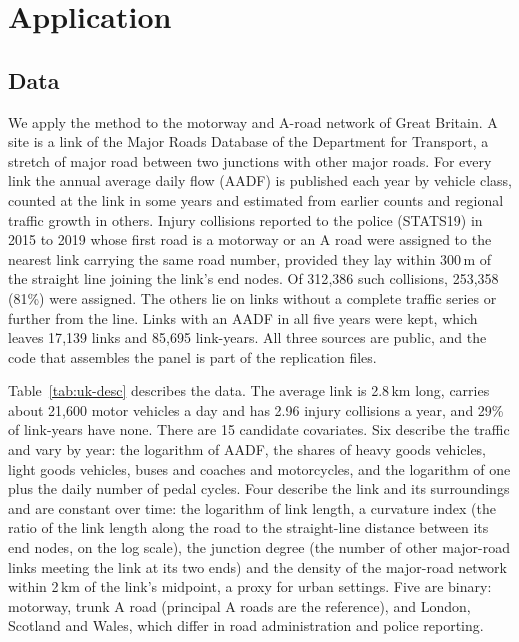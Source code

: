 \section{Application}\label{sec:application}

\subsection{Data}

We apply the method to the motorway and A-road network of Great Britain. A site is a link of the Major Roads Database of the Department for Transport, a stretch of major road between two junctions with other major roads. For every link the annual average daily flow (AADF) is published each year by vehicle class, counted at the link in some years and estimated from earlier counts and regional traffic growth in others. Injury collisions reported to the police (STATS19) in 2015 to 2019 whose first road is a motorway or an A road were assigned to the nearest link carrying the same road number, provided they lay within 300\,m of the straight line joining the link's end nodes. Of 312{,}386 such collisions, 253{,}358 (81\%) were assigned. The others lie on links without a complete traffic series or further from the line. Links with an AADF in all five years were kept, which leaves 17{,}139 links and 85{,}695 link-years. All three sources are public, and the code that assembles the panel is part of the replication files.

Table~\ref{tab:uk-desc} describes the data. The average link is 2.8\,km long, carries about 21{,}600 motor vehicles a day and has 2.96 injury collisions a year, and 29\% of link-years have none. There are 15 candidate covariates. Six describe the traffic and vary by year: the logarithm of AADF, the shares of heavy goods vehicles, light goods vehicles, buses and coaches and motorcycles, and the logarithm of one plus the daily number of pedal cycles. Four describe the link and its surroundings and are constant over time: the logarithm of link length, a curvature index (the ratio of the link length along the road to the straight-line distance between its end nodes, on the log scale), the junction degree (the number of other major-road links meeting the link at its two ends) and the density of the major-road network within 2\,km of the link's midpoint, a proxy for urban settings. Five are binary: motorway, trunk A road (principal A roads are the reference), and London, Scotland and Wales, which differ in road administration and police reporting.

